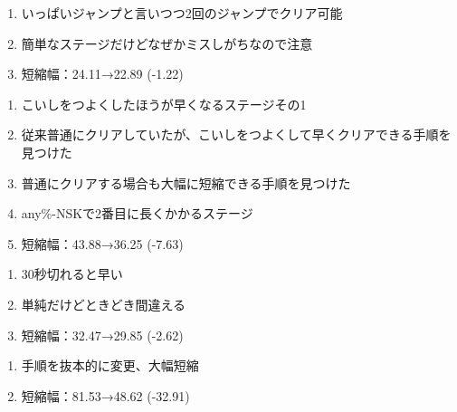 \begin{enumerate}[label={\sarrow}]
\item いっぱいジャンプと言いつつ2回のジャンプでクリア可能
\item 簡単なステージだけどなぜかミスしがちなので注意
\item 短縮幅：24.11→22.89 (-1.22)
\end{enumerate}



\clearpage
\begin{enumerate}[label={\sarrow}]
\item こいしをつよくしたほうが早くなるステージその1
\item 従来普通にクリアしていたが、こいしをつよくして早くクリアできる手順を見つけた
\item 普通にクリアする場合も大幅に短縮できる手順を見つけた
\item any\%-NSKで2番目に長くかかるステージ
\item 短縮幅：43.88→36.25 (-7.63)
\end{enumerate}



\begin{enumerate}[label={\sarrow}]
\item 30秒切れると早い
\item 単純だけどときどき間違える
\item 短縮幅：32.47→29.85 (-2.62)
\end{enumerate}



\begin{enumerate}[label={\sarrow}]
\item 手順を抜本的に変更、大幅短縮
\item 短縮幅：81.53→48.62 (-32.91)
\end{enumerate}



